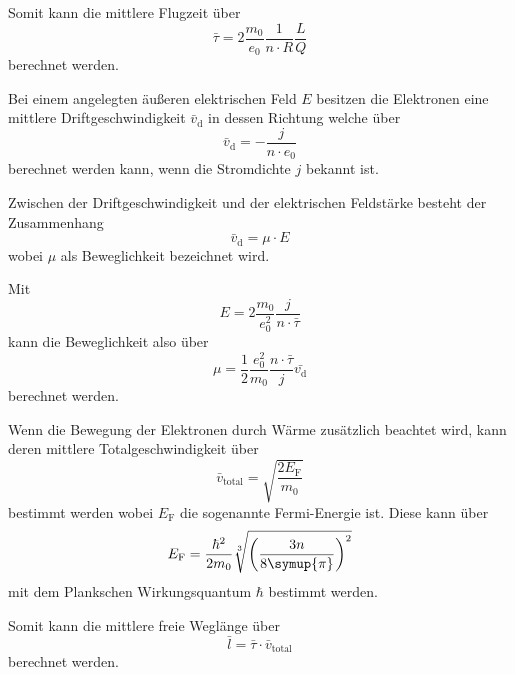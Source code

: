 Somit kann die mittlere Flugzeit über 
\begin{equation}
    \bar{\tau} = 2\frac{m_0}{e_0}\frac{1}{n \cdot R}\frac{L}{Q}
\end{equation}
berechnet werden. \cite{V311}

Bei einem angelegten äußeren elektrischen Feld $E$ besitzen die Elektronen eine mittlere Driftgeschwindigkeit $\bar{v}_\text{d}$ in dessen Richtung welche über 
\begin{equation}
    \bar{v}_\text{d} = -\frac{j}{n \cdot e_0}
    \label{eq:driftgeschwindigkeit}
\end{equation}
berechnet werden kann, wenn die Stromdichte $j$ bekannt ist. \cite{V311}

Zwischen der Driftgeschwindigkeit und der elektrischen Feldstärke besteht der Zusammenhang
\begin{equation}
    \bar{v}_\text{d} = \mu \cdot E
\end{equation}
wobei $\mu$ als Beweglichkeit bezeichnet wird. \cite{V311}

Mit 
\begin{equation}
    E = 2 \frac{m_0}{e_0^2}\frac{j}{n\cdot\bar{\tau}}
\end{equation}
kann die Beweglichkeit also über
\begin{equation}
    \mu = \frac{1}{2}\frac{e_0^2}{m_0}\frac{n\cdot\bar{\tau}}{j} \bar{v_\text{d}}
    \label{eq:beweglichkeit}
\end{equation}
berechnet werden.

Wenn die Bewegung der Elektronen durch Wärme zusätzlich beachtet wird, kann deren mittlere Totalgeschwindigkeit über
\begin{equation}
    \bar{v}_\text{total} = \sqrt{\frac{2 E_\text{F}}{m_0}}
    \label{eq:totalgeschwindigkeit}
\end{equation}
bestimmt werden wobei $E_\text{F}$ die sogenannte Fermi-Energie ist.
Diese kann über 
\begin{equation}
    E_\text{F} = \frac{\hbar^2}{2 m_0}\sqrt[3]{\left(\frac{3n}{8\symup{\pi}}\right)^2}
    \label{eq:fermienergie}
\end{equation}
mit dem Plankschen Wirkungsquantum $\hbar$ bestimmt werden. \cite{V311}

Somit kann die mittlere freie Weglänge über
\begin{equation}
    \bar{l} = \bar{\tau} \cdot \bar{v}_\text{total}
    \label{eq:weglaenge}
\end{equation}
berechnet werden.

